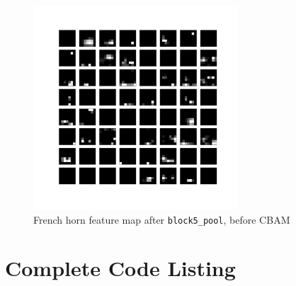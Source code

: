 \documentclass{article}
\begin{document}
\begin{appendices}
\begin{figure}[H]
    \centering
    \includegraphics[width=3in]{csci-8920/hw-4/images/horn-post-CBAM-18-block5_pool.png}
    \caption{French horn feature map after \lstinline{block5_pool}, before CBAM}
    \label{fig:horn_5_post}
\end{figure}
\section{Complete Code Listing} \label{codelist}
\newpage


\end{appendices}
\end{document}
